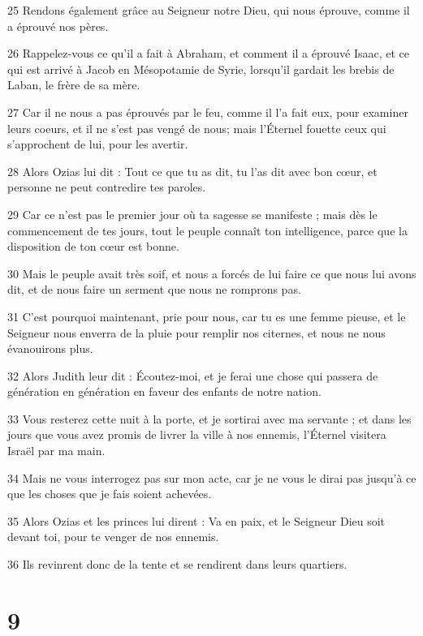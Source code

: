 \par 25 Rendons également grâce au Seigneur notre Dieu, qui nous éprouve, comme il a éprouvé nos pères.
\par 26 Rappelez-vous ce qu'il a fait à Abraham, et comment il a éprouvé Isaac, et ce qui est arrivé à Jacob en Mésopotamie de Syrie, lorsqu'il gardait les brebis de Laban, le frère de sa mère.
\par 27 Car il ne nous a pas éprouvés par le feu, comme il l'a fait eux, pour examiner leurs coeurs, et il ne s'est pas vengé de nous; mais l'Éternel fouette ceux qui s'approchent de lui, pour les avertir.
\par 28 Alors Ozias lui dit : Tout ce que tu as dit, tu l'as dit avec bon cœur, et personne ne peut contredire tes paroles.
\par 29 Car ce n'est pas le premier jour où ta sagesse se manifeste ; mais dès le commencement de tes jours, tout le peuple connaît ton intelligence, parce que la disposition de ton cœur est bonne.
\par 30 Mais le peuple avait très soif, et nous a forcés de lui faire ce que nous lui avons dit, et de nous faire un serment que nous ne romprons pas.
\par 31 C'est pourquoi maintenant, prie pour nous, car tu es une femme pieuse, et le Seigneur nous enverra de la pluie pour remplir nos citernes, et nous ne nous évanouirons plus.
\par 32 Alors Judith leur dit : Écoutez-moi, et je ferai une chose qui passera de génération en génération en faveur des enfants de notre nation.
\par 33 Vous resterez cette nuit à la porte, et je sortirai avec ma servante ; et dans les jours que vous avez promis de livrer la ville à nos ennemis, l'Éternel visitera Israël par ma main.
\par 34 Mais ne vous interrogez pas sur mon acte, car je ne vous le dirai pas jusqu'à ce que les choses que je fais soient achevées.
\par 35 Alors Ozias et les princes lui dirent : Va en paix, et le Seigneur Dieu soit devant toi, pour te venger de nos ennemis.
\par 36 Ils revinrent donc de la tente et se rendirent dans leurs quartiers.

\chapter{9}

